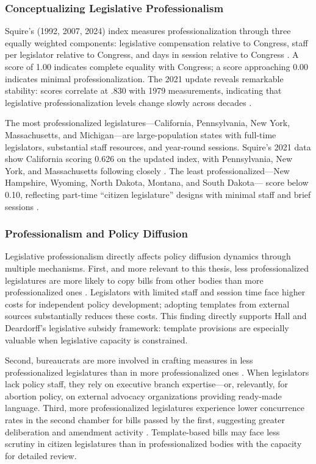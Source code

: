 \subsubsection{Conceptualizing Legislative Professionalism}
Squire's (1992, 2007, 2024) index measures professionalization through three equally weighted components: legislative compensation relative to Congress, staff per legislator relative to Congress, and days in session relative to Congress \parencite{squireLegislativeProfessionalizationMembership1992a, squireMeasuringStateLegislative2007, squireSquireIndexUpdate2024}. A score of 1.00 indicates complete equality with Congress; a score approaching 0.00 indicates minimal professionalization. The 2021 update reveals remarkable stability: scores correlate at .830 with 1979 measurements, indicating that legislative professionalization levels change slowly across decades \parencite[Table 1]{squireSquireIndexUpdate2024}.

The most professionalized legislatures---California, Pennsylvania, New York, Massachusetts, and Michigan---are large-population states with full-time legislators, substantial staff resources, and year-round sessions. Squire's 2021 data show California scoring 0.626 on the updated index, with Pennsylvania, New York, and Massachusetts following closely \parencite{squireSquireIndexUpdate2024}. The least professionalized---New Hampshire, Wyoming, North Dakota, Montana, and South Dakota--- score below 0.10, reflecting part-time ``citizen legislature'' designs with minimal staff and brief sessions \parencite[Table 1]{squireSquireIndexUpdate2024}.

\subsubsection{Professionalism and Policy Diffusion}
Legislative professionalism directly affects policy diffusion dynamics through multiple mechanisms. First, and more relevant to this thesis, less professionalized legislatures are more likely to copy bills from other bodies than more professionalized ones \parencite{jansaCopyPasteLawmaking2019}. Legislators with limited staff and session time face higher costs for independent policy development; adopting templates from external sources substantially reduces these costs. This finding directly supports Hall and Deardorff's legislative subsidy framework: template provisions are especially valuable when legislative capacity is constrained.

Second, bureaucrats are more involved in crafting measures in less professionalized legislatures than in more professionalized ones \parencite{kroegerBureaucratsLawmakers2022}. When legislators lack policy staff, they rely on executive branch expertise---or, relevantly, for abortion policy, on external advocacy organizations providing ready-made language. Third, more professionalized legislatures experience lower concurrence rates in the second chamber for bills passed by the first, suggesting greater deliberation and amendment activity \parencite{brownBicameralismHingesLegislative2024}. Template-based bills may face less scrutiny in citizen legislatures than in professionalized bodies with the capacity for detailed review.


